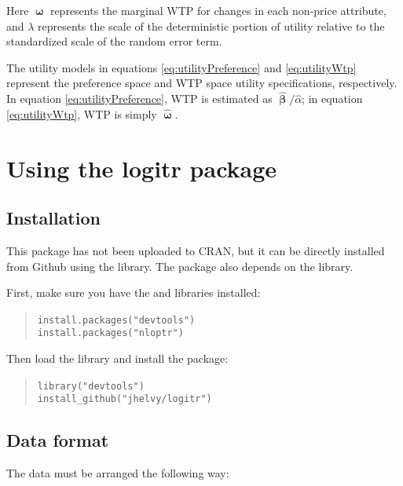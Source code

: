 \documentclass[article]{jss}
\begin{document}


Here \(\boldsymbol\upomega\) represents the marginal WTP for changes in
each non-price attribute, and \(\lambda\) represents the scale of the
deterministic portion of utility relative to the standardized scale of
the random error term.

The utility models in equations \ref{eq:utilityPreference} and
\ref{eq:utilityWtp} represent the preference space and WTP space utility
specifications, respectively. In equation \ref{eq:utilityPreference},
WTP is estimated as \(\hat{\boldsymbol\upbeta} / \hat{\alpha}\); in
equation \ref{eq:utilityWtp}, WTP is simply
\(\hat{\boldsymbol\upomega}\).

\hypertarget{using-the-logitr-package}{%
\section{Using the logitr package}\label{using-the-logitr-package}}

\hypertarget{installation}{%
\subsection{Installation}\label{installation}}

This package has not been uploaded to CRAN, but it can be directly
installed from Github using the  library. The package also
depends on the  library.

First, make sure you have the  and  libraries
installed:

\begin{quote}
\texttt{install.packages("devtools")}~\\
\texttt{install.packages("nloptr")}
\end{quote}

Then load the  library and install the 
package:

\begin{quote}
\texttt{library("devtools")}~\\
\texttt{install\_github("jhelvy/logitr")}
\end{quote}

\hypertarget{data-format}{%
\subsection{Data format}\label{data-format}}

The data must be arranged the following way:
\end{document}
